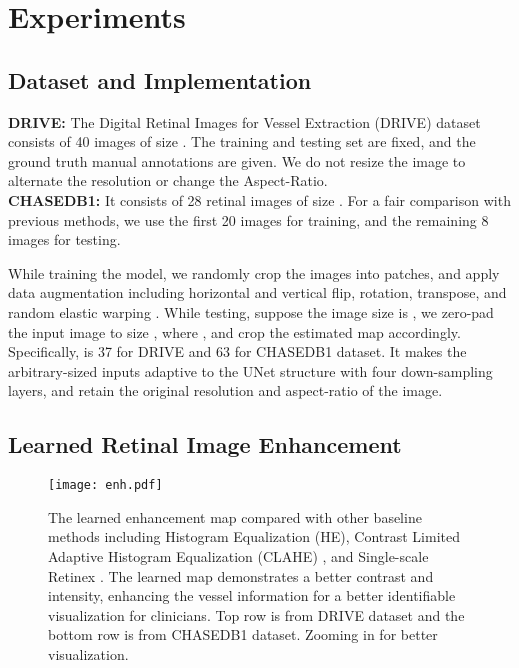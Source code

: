 \documentclass[runningheads]{llncs}
\begin{document}
\section{Experiments}
\subsection{Dataset and Implementation}
\textbf{DRIVE:} The Digital Retinal Images for Vessel Extraction (DRIVE) \cite{staal2004ridge} dataset consists of 40 images of size . The training and testing set are fixed, and the ground truth manual annotations are given. We do not resize the image to alternate the resolution or change the Aspect-Ratio.\\
\textbf{CHASEDB1:} \cite{fraz2012ensemble} It consists of 28 retinal images of size . For a fair comparison with previous methods, we use the first 20 images for training, and the remaining 8 images for testing.

While training the model, we randomly crop the images into  patches, and apply data augmentation including horizontal and vertical flip, rotation, transpose, and random elastic warping \cite{simard2003best}. While testing, suppose the image size is , we zero-pad the input image to size , where , and crop the estimated map accordingly. Specifically,  is 37 for DRIVE and 63 for CHASEDB1 dataset. It makes the arbitrary-sized inputs adaptive to the UNet structure with four down-sampling layers, and retain the original resolution and aspect-ratio of the image. 

\subsection{Learned Retinal Image Enhancement}
\begin{figure}[t]\centering
\texttt{[image: enh.pdf]}
\caption{The learned enhancement map  compared with other baseline methods including Histogram Equalization (HE), Contrast Limited Adaptive Histogram Equalization (CLAHE) 
\cite{pizer1987adaptive}, and Single-scale Retinex \cite{zhao2015retinal}. The learned map demonstrates a better contrast and intensity, enhancing the vessel information for a better identifiable visualization for clinicians. Top row is from DRIVE dataset and the bottom row is from CHASEDB1 dataset. Zooming in for better visualization. }
  \label{fig:enh}
\end{figure}
\end{document}
